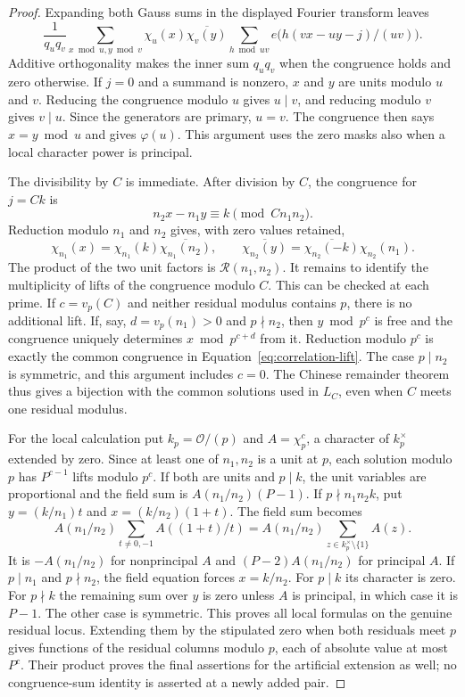 \documentclass[11pt,a4paper]{article}
\numberwithin{equation}{section}
\numberwithin{figure}{section}
\theoremstyle{definition}
\theoremstyle{remark}
\begin{document}
\begin{proof}
Expanding both Gauss sums in the displayed Fourier transform leaves
\[
 \frac1{q_uq_v}\sum_{x\bmod u,y\bmod v}\chi_u(x)\overline{\chi_v(y)}
 \sum_{h\bmod uv}e\bigl(h(vx-uy-j)/(uv)\bigr).
\]
Additive orthogonality makes the inner sum $q_uq_v$ when the congruence holds
and zero otherwise.  If $j=0$ and a summand is nonzero, $x$ and $y$ are units
modulo $u$ and $v$.  Reducing the congruence modulo $u$ gives $u\mid v$, and
reducing modulo $v$ gives $v\mid u$.  Since the generators are primary,
$u=v$.  The congruence then says $x=y\bmod u$ and gives $\varphi(u)$.  This
argument uses the zero masks also when a local character power is principal.

The divisibility by $C$ is immediate.  After division by $C$, the congruence
for $j=Ck$ is
\[
 n_2x-n_1y\equiv k\pmod{Cn_1n_2}.
\]
Reduction modulo $n_1$ and $n_2$ gives, with zero values retained,
\[
 \chi_{n_1}(x)=\chi_{n_1}(k)\overline{\chi_{n_1}(n_2)},\qquad
 \overline{\chi_{n_2}(y)}
 =\overline{\chi_{n_2}(-k)}\chi_{n_2}(n_1).
\]
The product of the two unit factors is $\mathcal R(n_1,n_2)$.
It remains to identify the multiplicity of lifts of the congruence modulo
$C$.  This can be checked at each prime.  If $c=v_p(C)$ and neither residual
modulus contains $p$, there is no additional lift.  If, say,
$d=v_p(n_1)>0$ and $p\nmid n_2$, then $y\bmod p^c$ is free and the congruence
uniquely determines $x\bmod p^{c+d}$ from it.  Reduction modulo $p^c$ is
exactly the common congruence in Equation~\eqref{eq:correlation-lift}.
The case $p\mid n_2$ is symmetric, and this argument includes $c=0$.
The Chinese remainder theorem thus gives a bijection with the common
solutions used in $L_C$, even when $C$ meets one residual modulus.

For the local calculation put $k_p=\mathcal O/(p)$ and $A=\chi_p^c$, a
character of $k_p^\times$ extended by zero.  Since at least one of
$n_1,n_2$ is a unit at $p$, each
solution modulo $p$ has $P^{c-1}$ lifts modulo $p^c$.  If both are units and
$p\mid k$, the unit variables are proportional and the field sum is
$A(n_1/n_2)(P-1)$.  If $p\nmid n_1n_2k$, put
$y=(k/n_1)t$ and $x=(k/n_2)(1+t)$.  The field sum becomes
\[
 A(n_1/n_2)\sum_{t\ne0,-1}A((1+t)/t)
 =A(n_1/n_2)\sum_{z\in k_p^\times\setminus\{1\}}A(z).
\]
It is $-A(n_1/n_2)$ for nonprincipal $A$ and
$(P-2)A(n_1/n_2)$ for principal $A$.  If $p\mid n_1$ and $p\nmid n_2$, the
field equation forces $x=k/n_2$.  For $p\mid k$ its character is zero.  For
$p\nmid k$ the remaining sum over $y$ is zero unless $A$ is principal, in
which case it is $P-1$.  The other case is symmetric.  This proves all local
formulas on the genuine residual locus.  Extending them by the stipulated
zero when both residuals meet $p$ gives functions of the residual columns
modulo $p$, each of absolute value at most $P^c$.  Their product proves the
final assertions for the artificial extension as well; no congruence-sum
identity is asserted at a newly added pair.
\end{proof}
\end{document}
